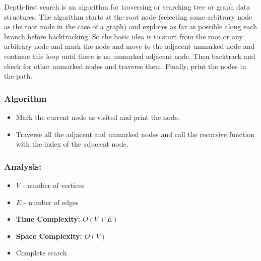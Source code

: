Depth-first search is an algorithm for traversing or searching tree or
graph data structures. The algorithm starts at the root node (selecting
some arbitrary node as the root node in the case of a graph) and
explores as far as possible along each branch before backtracking. So
the basic idea is to start from the root or any arbitrary node and mark
the node and move to the adjacent unmarked node and continue this loop
until there is no unmarked adjacent node. Then backtrack and check for
other unmarked nodes and traverse them. Finally, print the nodes in the
path.

\subsubsection*{Algorithm}

\begin{itemize}
    \item Mark the current node as visited and print the node.
    \item Traverse all the adjacent and unmarked nodes and call the recursive
          function with the index of the adjacent node.
\end{itemize}

\subsubsection*{Analysis:}

\begin{itemize}
    \item $V$ - number of vertices
    \item $E$ - number of edges
    \item \textbf{Time Complexity:} $O(V+E)$
    \item \textbf{Space Complexity:} $O(V)$
    \item Complete search
\end{itemize}